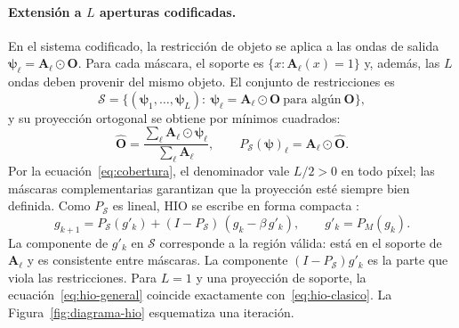 \documentclass[11pt,a4paper]{article}
\newcommand{\Obj}{\mathbf{O}}
\newcommand{\hio}{\textsc{HIO}}
\begin{document}
\paragraph{Extensión a $L$ aperturas codificadas.} En el sistema codificado, la restricción de objeto se aplica a las ondas de salida $\boldsymbol\psi_\ell=\mathbf{A}_\ell\odot\Obj$. Para cada máscara, el soporte es $\{x:\mathbf{A}_\ell(x)=1\}$ y, además, las $L$ ondas deben provenir del mismo objeto. El conjunto de restricciones es
\begin{equation}
    \mathcal{S}=\big\{(\boldsymbol\psi_1,\dots,\boldsymbol\psi_L):\ \boldsymbol\psi_\ell=\mathbf{A}_\ell\odot\Obj\ \text{para algún}\ \Obj\big\},
\end{equation}
y su proyección ortogonal se obtiene por mínimos cuadrados:
\begin{equation}
    \widehat{\Obj}=\frac{\sum_\ell\mathbf{A}_\ell\odot\boldsymbol\psi_\ell}{\sum_\ell\mathbf{A}_\ell},
    \qquad
    P_\mathcal{S}(\boldsymbol\psi)_\ell=\mathbf{A}_\ell\odot\widehat{\Obj}.
    \label{eq:ps}
\end{equation}
Por la ecuación~\eqref{eq:cobertura}, el denominador vale $L/2>0$ en todo píxel; las máscaras complementarias garantizan que la proyección esté siempre bien definida. Como $P_\mathcal{S}$ es lineal, \hio{} se escribe en forma compacta \cite{bauschke2002}:
\begin{equation}
    \boxed{\,g_{k+1}=P_\mathcal{S}(g'_k)+(I-P_\mathcal{S})\,(g_k-\beta\,g'_k),\qquad g'_k=P_M(g_k).\,}
    \label{eq:hio-general}
\end{equation}
La componente de $g'_k$ en $\mathcal{S}$ corresponde a la región válida: está en el soporte de $\mathbf{A}_\ell$ y es consistente entre máscaras. La componente $(I-P_\mathcal{S})g'_k$ es la parte que viola las restricciones. Para $L=1$ y una proyección de soporte, la ecuación~\eqref{eq:hio-general} coincide exactamente con~\eqref{eq:hio-clasico}. La Figura~\ref{fig:diagrama-hio} esquematiza una iteración.
\end{document}
